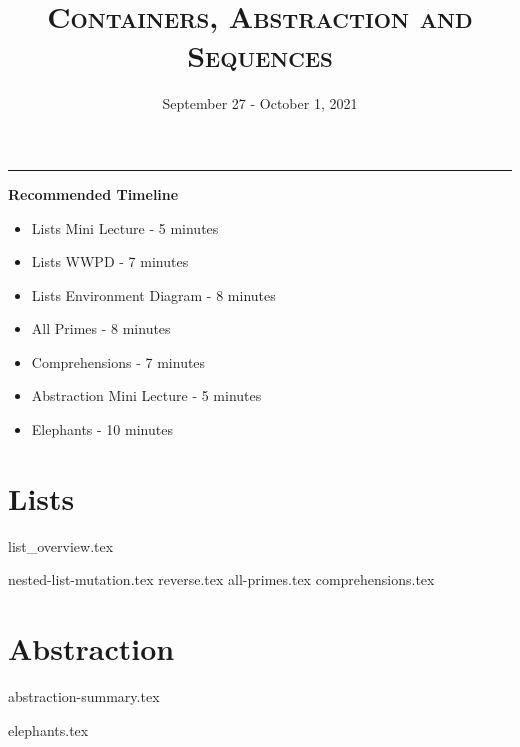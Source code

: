 \documentclass{exam}
\title{\textsc{Containers, Abstraction and Sequences}}
\date{September 27 - October 1, 2021}
\begin{document}
\maketitle
\rule{\textwidth}{0.15em}
\fontsize{12}{15}\selectfont


\begin{guide}
    \textbf{Recommended Timeline}
    \begin{itemize}
        \item Lists Mini Lecture - 5 minutes
        \item Lists WWPD - 7 minutes
        \item Lists Environment Diagram - 8 minutes
        \item All Primes - 8 minutes
        \item Comprehensions - 7 minutes
        \item Abstraction Mini Lecture - 5 minutes
        \item Elephants - 10 minutes
    \end{itemize}
\end{guide}

\section{Lists}
{list_overview.tex}
\begin{questions}
    {nested-list-mutation.tex}
    {reverse.tex}
    \newpage %
    {all-primes.tex}
    {comprehensions.tex}
\end{questions}

\newpage
\section{Abstraction}
{abstraction-summary.tex}
\begin{questions}
    {elephants.tex}
\end{questions}
\end{document}
